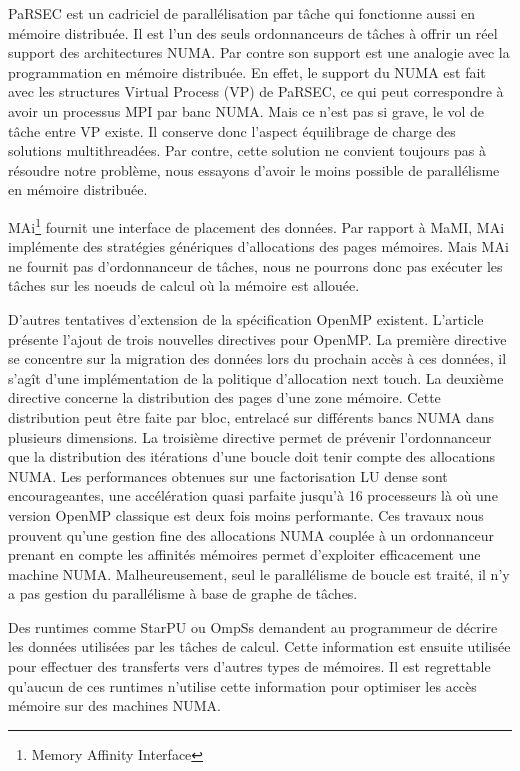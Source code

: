 PaRSEC est un cadriciel de parallélisation par tâche qui fonctionne aussi en mémoire distribuée.
%
Il est l'un des seuls ordonnanceurs de tâches à offrir un réel support des architectures NUMA.
%
Par contre son support est une analogie avec la programmation en mémoire distribuée.
%
En effet, le support du NUMA est fait avec les structures Virtual Process (VP) de PaRSEC, ce qui peut correspondre à avoir un processus MPI par banc NUMA.
%
Mais ce n'est pas si grave, le vol de tâche entre VP existe.
%
Il conserve donc l'aspect équilibrage de charge des solutions multithreadées.
%
Par contre, cette solution ne convient toujours pas à résoudre notre problème, nous essayons d'avoir le moins possible de parallélisme en mémoire distribuée.

MAi\footnote{Memory Affinity Interface}\cite{mai} fournit une interface de placement des données.
%
Par rapport à MaMI, MAi implémente des stratégies génériques d'allocations des pages mémoires.
%
Mais MAi ne fournit pas d'ordonnanceur de tâches, nous ne pourrons donc pas exécuter les tâches sur les noeuds de calcul où la mémoire est allouée.


D'autres tentatives d'extension de la spécification OpenMP existent.
%
L'article~\cite{openmp_numa} présente l'ajout de trois nouvelles directives pour OpenMP.
%
La première directive se concentre sur la migration des données lors du prochain accès à ces données, il s'agît d'une implémentation de la politique d'allocation next touch.
%
La deuxième directive concerne la distribution des pages d'une zone mémoire.
%
Cette distribution peut être faite par bloc, entrelacé sur différents bancs NUMA dans plusieurs dimensions.
%
La troisième directive permet de prévenir l'ordonnanceur que la distribution des itérations d'une boucle doit tenir compte des allocations NUMA.
%
Les performances obtenues sur une factorisation LU dense sont encourageantes, une accélération quasi parfaite jusqu'à 16 processeurs là où une version OpenMP classique est deux fois moins performante.
%
Ces travaux nous prouvent qu'une gestion fine des allocations NUMA couplée à un ordonnanceur prenant en compte les affinités mémoires permet d'exploiter efficacement une machine NUMA.
%
Malheureusement, seul le parallélisme de boucle est traité, il n'y a pas gestion du parallélisme à base de graphe de tâches.


Des runtimes comme StarPU ou OmpSs demandent au programmeur de décrire les données utilisées par les tâches de calcul.
%
Cette information est ensuite utilisée pour effectuer des transferts vers d'autres types de mémoires.
%
Il est regrettable qu'aucun de ces runtimes n'utilise cette information pour optimiser les accès mémoire sur des machines NUMA.
